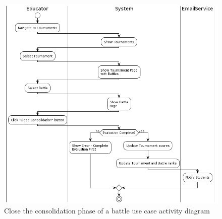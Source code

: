 \begin{center}
\begin{tabular}{ |c|m{10cm}| }
        \hline
    \end{tabular}
    \begin{figure}[H]
        \hspace{-10px}
        \includegraphics[scale=0.5]{Diagrams/activity_closebattleconsolidationphase.png}
        \caption{Close the consolidation phase of a battle use case activity diagram}
    \end{figure}
\end{center}


